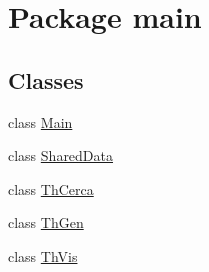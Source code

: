 \hypertarget{namespacemain}{}\section{Package main}
\label{namespacemain}
\subsection*{Classes}
\begin{DoxyCompactItemize}
\item 
class \mbox{\hyperlink{classmain_1_1_main}{Main}}
\item 
class \mbox{\hyperlink{classmain_1_1_shared_data}{Shared\+Data}}
\item 
class \mbox{\hyperlink{classmain_1_1_th_cerca}{Th\+Cerca}}
\item 
class \mbox{\hyperlink{classmain_1_1_th_gen}{Th\+Gen}}
\item 
class \mbox{\hyperlink{classmain_1_1_th_vis}{Th\+Vis}}
\end{DoxyCompactItemize}
